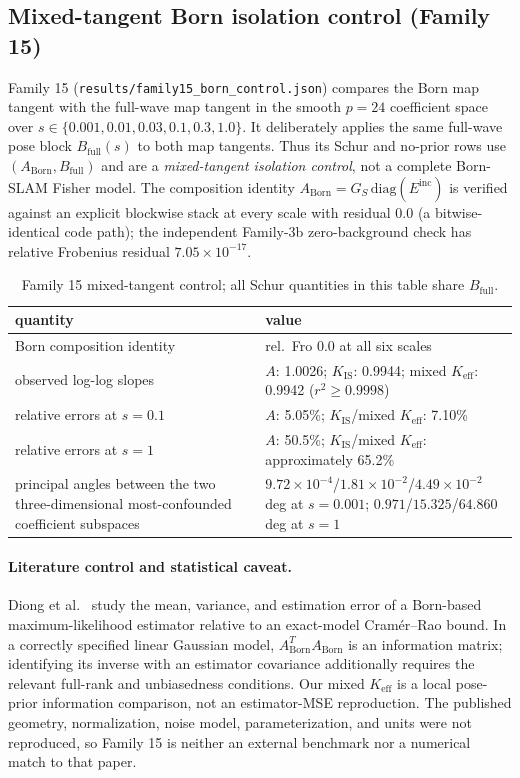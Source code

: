 \documentclass[12pt]{article}
\begin{document}
\subsection{Mixed-tangent Born isolation control (Family 15)}\label{sec:family15}

Family 15 (\texttt{results/family15\_born\_control.json}) compares the Born
map tangent with the full-wave map tangent in the smooth $p=24$ coefficient
space over $s\in\{0.001,0.01,0.03,0.1,0.3,1.0\}$. It deliberately applies the
same full-wave pose block $B_{\mathrm{full}}(s)$ to both map tangents. Thus its
Schur and no-prior rows use $(A_{\mathrm{Born}},B_{\mathrm{full}})$ and are a
\emph{mixed-tangent isolation control}, not a complete Born-SLAM Fisher model.
The composition identity
$A_{\mathrm{Born}}=G_S\,\mathrm{diag}(E^{\mathrm{inc}})$ is verified against an
explicit blockwise stack at every scale with residual 0.0 (a bitwise-identical
code path); the independent Family-3b zero-background check has relative
Frobenius residual $7.05\times10^{-17}$.

\begin{table}[htbp]
\centering
\small
\caption{Family 15 mixed-tangent control; all Schur quantities in this table
share $B_{\mathrm{full}}$.}
\label{tab:f15}
\begin{tabular}{p{} p{}}
\toprule
quantity & value \\
\midrule
Born composition identity & rel.\ Fro 0.0 at all six scales \\
observed log-log slopes & $A$: 1.0026; $K_{\mathrm{IS}}$: 0.9944;
mixed $K_{\mathrm{eff}}$: 0.9942 ($r^2\ge0.9998$) \\
relative errors at $s=0.1$ & $A$: 5.05\%; $K_{\mathrm{IS}}$/mixed
$K_{\mathrm{eff}}$: 7.10\% \\
relative errors at $s=1$ & $A$: 50.5\%; $K_{\mathrm{IS}}$/mixed
$K_{\mathrm{eff}}$: approximately 65.2\% \\
principal angles between the two three-dimensional most-confounded
coefficient subspaces & $9.72\times10^{-4}$/$1.81\times10^{-2}$/$4.49\times
10^{-2}$ deg at $s=0.001$; $0.971$/$15.325$/$64.860$ deg at $s=1$ \\
\bottomrule
\end{tabular}
\end{table}

\paragraph{Literature control and statistical caveat.}
Diong et al.~\cite{diong} study the mean, variance, and estimation error of a
Born-based maximum-likelihood estimator relative to an exact-model
Cram\'er--Rao bound. In a correctly specified linear Gaussian model,
$A_{\mathrm{Born}}^TA_{\mathrm{Born}}$ is an information matrix; identifying
its inverse with an estimator covariance additionally requires the relevant
full-rank and unbiasedness conditions. Our mixed $K_{\mathrm{eff}}$ is a local
pose-prior information comparison, not an estimator-MSE reproduction. The
published geometry, normalization, noise model, parameterization, and units
were not reproduced, so Family 15 is neither an external benchmark nor a
numerical match to that paper.
\end{document}
